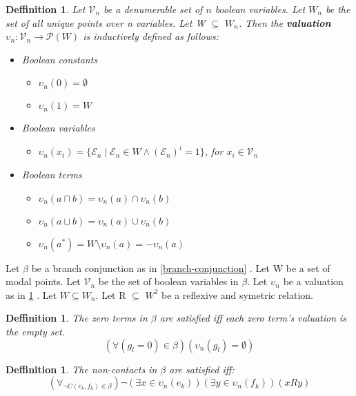 \documentclass{article}
\newcommand\p{\mathcal{P}}
\newcommand\V{\mathcal{V}}
\newcommand\E{\mathcal{E}}
\newtheorem{defn}[theorem]{Deffinition}
\begin{document}
		\begin{defn}
			\label{valuation-modal-points}
			Let $\V_n$ be a denumerable set of $n$ boolean variables. Let $W_n$ be the set of all unique points over n variables. Let W $\subseteq$ $W_n$. Then the \textbf{valuation $\upsilon_n : \V_n \rightarrow \p(W)$} is inductively defined as follows:
			\begin{itemize}
				\item Boolean constants
					\begin{itemize}
						\item $\upsilon_n(0) = \emptyset$
						\item $\upsilon_n(1) = W$
					\end{itemize}
				\item Boolean variables
					\begin{itemize}
						\item $\upsilon_n(x_i) = \{ \E_n \mid \E_n \in W \land (\E_n)^i = 1 \}$, for $x_i \in \V_n$
					\end{itemize}
				\item Boolean terms
					\begin{itemize}
						\item $\upsilon_n(a \sqcap b) = \upsilon_n(a) \cap \upsilon_n(b)$
						\item $\upsilon_n(a \sqcup b) = \upsilon_n(a) \cup \upsilon_n(b)$
						\item $\upsilon_n(a^*) = W \setminus \upsilon_n(a) = -\upsilon_n(a)$
					\end{itemize}
			\end{itemize}
		\end{defn}

		Let $\beta$ be a branch conjunction as in \ref{branch-conjunction} . Let W be a set of modal points. Let $\V_n$ be the set of boolean variables in $\beta$. Let $\upsilon_n$ be a valuation as in \ref{valuation-modal-points} . Let $W \subseteq W_n$. Let R $\subseteq$ $W^2$ be a reflexive and symetric relation.

		\begin{defn}
			The zero terms in $\beta$ are satisfied iff each zero term's valuation is the empty set.
			\begin{equation}
				(\forall (g_l = 0) \in \beta)(\upsilon_n(g_l) = \emptyset)
			\end{equation}
		\end{defn}

		\begin{defn}
			The non-contacts in $\beta$ are satisfied iff:
			\begin{equation}
				(\forall_{\neg C(e_k, f_k) \in \beta})\neg(\exists x \in \upsilon_n(e_k))(\exists y \in \upsilon_n(f_k))(xRy)
			\end{equation}
		\end{defn}
\end{document}
